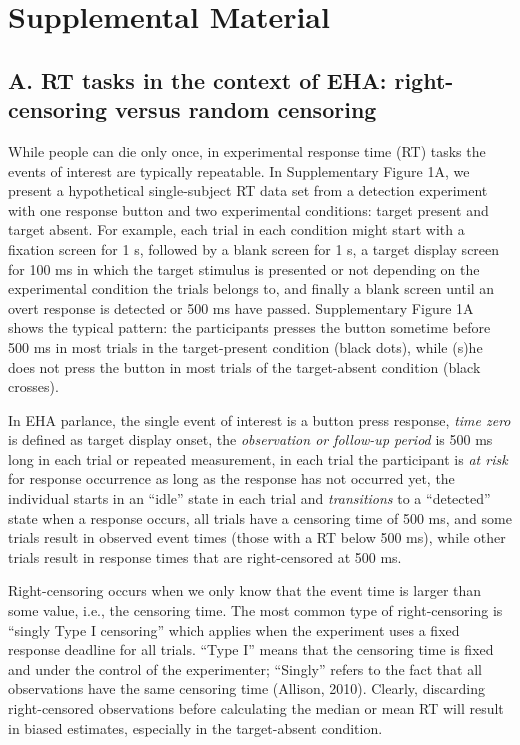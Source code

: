 \documentclass[
  man,floatsintext]{apa6}
\author{\phantom{0}}
\date{}
\affiliation{\phantom{0}}
\begin{document}
\renewcommand{\figurename}{Supplementary Figure}
\renewcommand{\tablename}{Supplemetentary Table}

\section{Supplemental Material}\label{supplemental-material}

\subsection{A. RT tasks in the context of EHA: right-censoring versus random censoring}\label{a.-rt-tasks-in-the-context-of-eha-right-censoring-versus-random-censoring}

While people can die only once, in experimental response time (RT) tasks the events of interest are typically repeatable. In Supplementary Figure 1A, we present a hypothetical single-subject RT data set from a detection experiment with one response button and two experimental conditions: target present and target absent. For example, each trial in each condition might start with a fixation screen for 1 s, followed by a blank screen for 1 s, a target display screen for 100 ms in which the target stimulus is presented or not depending on the experimental condition the trials belongs to, and finally a blank screen until an overt response is detected or 500 ms have passed. Supplementary Figure 1A shows the typical pattern: the participants presses the button sometime before 500 ms in most trials in the target-present condition (black dots), while (s)he does not press the button in most trials of the target-absent condition (black crosses).

In EHA parlance, the single event of interest is a button press response, \emph{time zero} is defined as target display onset, the \emph{observation or follow-up period} is 500 ms long in each trial or repeated measurement, in each trial the participant is \emph{at risk} for response occurrence as long as the response has not occurred yet, the individual starts in an ``idle'' state in each trial and \emph{transitions} to a ``detected'' state when a response occurs, all trials have a censoring time of 500 ms, and some trials result in observed event times (those with a RT below 500 ms), while other trials result in response times that are right-censored at 500 ms.

Right-censoring occurs when we only know that the event time is larger than some value, i.e., the censoring time. The most common type of right-censoring is ``singly Type I censoring'' which applies when the experiment uses a fixed response deadline for all trials. ``Type I'' means that the censoring time is fixed and under the control of the experimenter; ``Singly'' refers to the fact that all observations have the same censoring time (Allison, 2010). Clearly, discarding right-censored observations before calculating the median or mean RT will result in biased estimates, especially in the target-absent condition.
\end{document}
